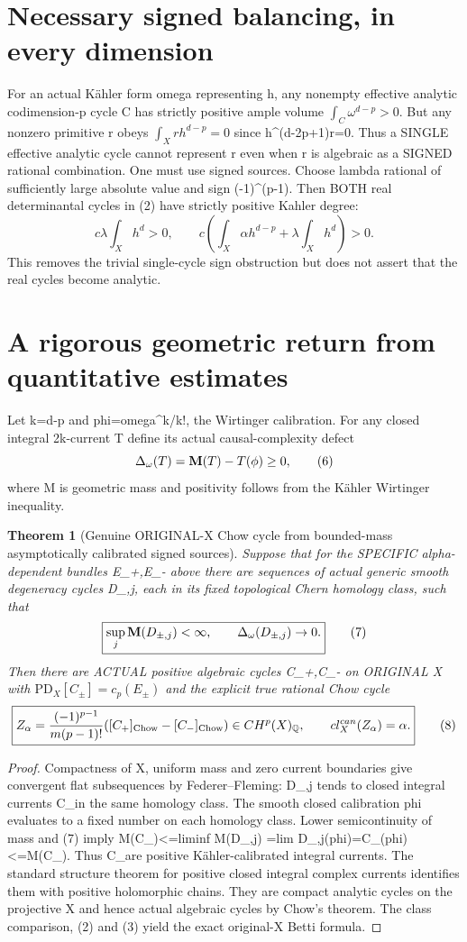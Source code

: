 \documentclass[11pt]{article}
\newtheorem{theorem}{Theorem}
\begin{document}
\section{Necessary signed balancing, in every dimension}
For an actual Kähler form omega representing h,
any nonempty effective analytic codimension-p
cycle C has strictly positive ample volume
$\int_C\omega^{d-p}>0$.
But any nonzero primitive r obeys
$\int_Xr h^{d-p}=0$ since
h^(d-2p+1)r=0. Thus a SINGLE effective
analytic cycle cannot represent r even when
r is algebraic as a SIGNED rational combination.
One must use signed sources.
Choose lambda rational of sufficiently large
absolute value and sign (-1)^(p-1).
Then BOTH real determinantal cycles in (2)
have strictly positive Kahler degree:
\[
 c\lambda\int_Xh^d>0,\qquad
 c\left(\int_X\alpha h^{d-p}
              +\lambda\int_Xh^d\right)>0.         \tag{5}
\]
This removes the trivial single-cycle
sign obstruction but does not assert
that the real cycles become analytic.

\section{A rigorous geometric return from quantitative estimates}
Let k=d-p and phi=omega^k/k!,
the Wirtinger calibration. For any
closed integral 2k-current T define
its actual causal-complexity defect
\[
 \Delta_\omega(T)={\bf M}(T)-T(\phi)\ge0,        \tag{6}
\]
where M is geometric mass and positivity follows
from the Kähler Wirtinger inequality.

\begin{theorem}[Genuine ORIGINAL-X Chow cycle from bounded-mass asymptotically calibrated signed sources]
Suppose that for the SPECIFIC alpha-dependent
bundles E_+,E_- above there are sequences of
actual generic smooth degeneracy cycles
D_{\pm,j}, each in its fixed topological
Chern homology class, such that
\[
 \boxed{\sup_j {\bf M}(D_{\pm,j})<\infty,\qquad
        \Delta_\omega(D_{\pm,j})\to0.}          \tag{7}
\]
Then there are ACTUAL positive algebraic
cycles C_+,C_- on ORIGINAL X with
$\mathrm{PD}_X[C_\pm]=c_p(E_\pm)$
and the explicit true rational Chow cycle
\[
 \boxed{
 Z_\alpha=\frac{(-1)^{p-1}}{m(p-1)!}
       ([C_+]_{\rm Chow}-[C_-]_{\rm Chow})
 \in CH^p(X)_{\mathbb Q},\qquad
 cl_X^{can}(Z_\alpha)=\alpha.
 }                                                       \tag{8}
\]
\end{theorem}
\begin{proof}
Compactness of X, uniform mass and zero
current boundaries give convergent flat
subsequences by Federer--Fleming:
D_{\pm,j} tends to closed integral
currents C_\pm in the same homology class.
The smooth closed calibration phi evaluates
to a fixed number on each homology class.
Lower semicontinuity of mass and (7) imply
M(C_\pm)<=liminf M(D_{\pm,j})
 =lim D_{\pm,j}(phi)=C_\pm(phi)<=M(C_\pm).
Thus C_\pm are positive Kähler-calibrated
integral currents. The standard structure
theorem for positive closed integral
complex currents identifies them with
positive holomorphic chains. They are
compact analytic cycles on the projective X
and hence actual algebraic cycles by Chow's
theorem. The class comparison, (2) and (3)
yield the exact original-X Betti formula.
\end{proof}
\end{document}
